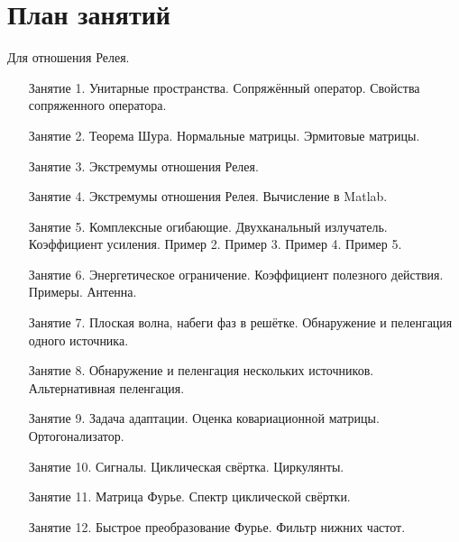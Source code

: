 \chapter{План занятий}

Для отношения Релея.
\begin{itemize}
    \item[Занятие 1.] Унитарные пространства. Сопряжённый оператор. Свойства сопряженного оператора.
    \item[Занятие 2.] Теорема Шура. Нормальные матрицы. Эрмитовые матрицы.
    \item[Занятие 3.] Экстремумы отношения Релея.
    \item[Занятие 4.] Экстремумы отношения Релея. Вычисление в Matlab.
    \item[Занятие 5.] Комплексные огибающие. Двухканальный излучатель. Коэффициент усиления. Пример 2. Пример 3. Пример 4. Пример 5.
    \item[Занятие 6.] Энергетическое ограничение. Коэффициент полезного действия. Примеры. Антенна.
    \item[Занятие 7.] Плоская волна, набеги фаз в решётке. Обнаружение и пеленгация одного источника.
    \item[Занятие 8.] Обнаружение и пеленгация нескольких источников. Альтернативная пеленгация.
    \item[Занятие 9.] Задача адаптации. Оценка ковариационной матрицы. Ортогонализатор.
    \item[Занятие 10.] Сигналы. Циклическая свёртка. Циркулянты.
    \item[Занятие 11.] Матрица Фурье. Спектр циклической свёртки.
    \item[Занятие 12.] Быстрое преобразование Фурье. Фильтр нижних частот.
\end{itemize}
